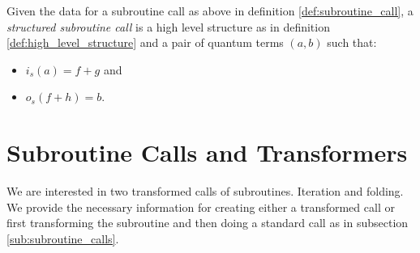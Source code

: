 \begin{definition}\label{def:structured_subroutine_call}
  Given the data for a subroutine call as above in definition
  \ref{def:subroutine_call}, a \emph{structured subroutine call} is a
  high level structure as in definition \ref{def:high_level_structure}
  and a pair of quantum terms $(a,b)$ such that:
  \begin{itemize}
    \item $i_s(a) = f+g$ and
    \item $o_s(f+h) = b$.
  \end{itemize}

\end{definition}



\section{Subroutine Calls and Transformers} %
\label{sec:subroutine_calls_and_transformers}

We are interested in two transformed calls of subroutines. Iteration and
folding. We provide the necessary information for creating either a
transformed call or first transforming the subroutine and then doing a
standard call as in subsection \ref{sub:subroutine_calls}.


